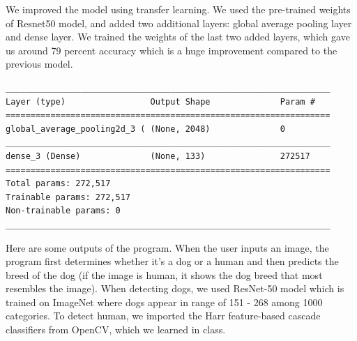 \documentclass[a4paper]{article}
\begin{document}
We improved the model using transfer learning. We used the pre-trained weights of Resnet50 model, and added two additional layers: global average pooling layer and dense layer. We trained the weights of the last two added layers, which gave us around 79 percent accuracy which is a huge improvement compared to the previous model. 

\begin{verbatim}
_________________________________________________________________
Layer (type)                 Output Shape              Param #   
=================================================================
global_average_pooling2d_3 ( (None, 2048)              0         
_________________________________________________________________
dense_3 (Dense)              (None, 133)               272517    
=================================================================
Total params: 272,517
Trainable params: 272,517
Non-trainable params: 0
_________________________________________________________________
\end{verbatim}

Here are some outputs of the program. When the user inputs an image, the program first determines whether it's a dog or a human and then predicts the breed of the dog (if the image is human, it shows the dog breed that most resembles the image). When detecting dogs, we used ResNet-50 model which is trained on ImageNet where dogs appear in range of 151 - 268 among 1000 categories. To detect human, we imported the Harr feature-based cascade classifiers from OpenCV, which we learned in class.
\end{document}
